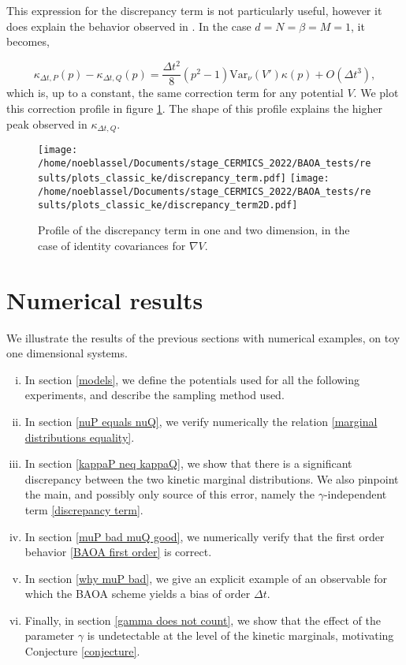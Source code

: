 \begin{remark}\label{remark}
  This expression for the discrepancy term is not particularly useful, however it does explain the behavior observed in \cite{KK22}. In the case $d=N=\beta=M=1$, it becomes,

  $$\kappa_{\Delta t,P}(p)- \kappa_{\Delta t,Q}(p)=\frac{\Delta t^2}8(p^2-1)\mathrm{Var}_\nu(V')\kappa(p)+O(\Delta t^3),$$
  which is, up to a constant, the same correction term for any potential $V$. We plot this correction profile in figure \ref{fig:discrepancy_term}. The shape of this profile explains the higher peak observed in $\kappa_{\Delta t,Q}$.
\end{remark}

\begin{figure}[htbp]
  \begin{center}
    \texttt{[image: /home/noeblassel/Documents/stage\_CERMICS\_2022/BAOA\_tests/results/plots\_classic\_ke/discrepancy\_term.pdf]}
    \texttt{[image: /home/noeblassel/Documents/stage\_CERMICS\_2022/BAOA\_tests/results/plots\_classic\_ke/discrepancy\_term2D.pdf]}
    \caption{ \label{fig:discrepancy_term}
      Profile of the discrepancy term in one and two dimension, in the case of identity covariances for $\nabla V$.
    }
  \end{center}
\end{figure}

\section{Numerical results}
We illustrate the results of the previous sections with numerical examples, on toy one dimensional systems.
\begin{enumerate}[(i)]
  \item In section \ref{models}, we define the potentials used for all the following experiments, and describe the sampling method used.
  \item In section \ref{nuP equals nuQ}, we verify numerically the relation \eqref{marginal distributions equality}.
  \item In section \ref{kappaP neq kappaQ}, we show that there is a significant discrepancy between the two kinetic marginal distributions. We also pinpoint the main, and possibly only source of this error, namely the $\gamma$-independent term \eqref{discrepancy term}.
  \item In section \ref{muP bad muQ good}, we numerically verify that the first order behavior \eqref{BAOA first order} is correct.
  \item In section \ref{why muP bad}, we give an explicit example of an observable for which the BAOA scheme yields a bias of order $\Delta t$.
  \item Finally, in section \ref{gamma does not count}, we show that the effect of the parameter $\gamma$ is undetectable at the level of the kinetic marginals, motivating Conjecture \ref{conjecture}.
\end{enumerate}


